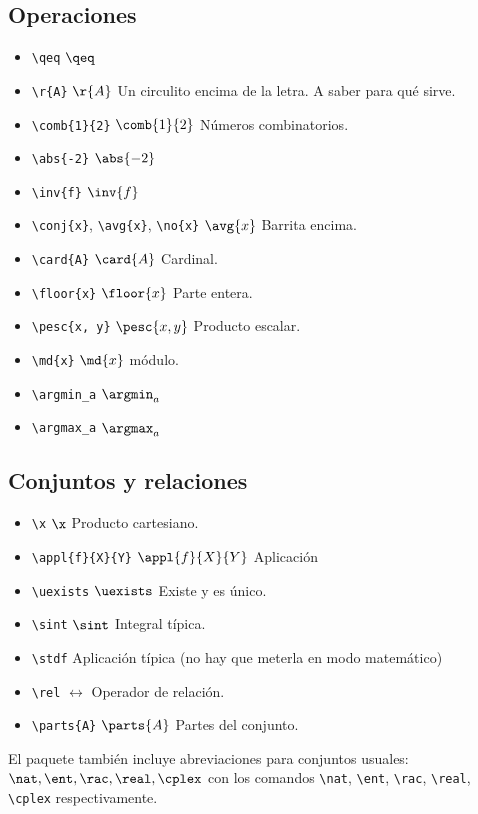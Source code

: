 \documentclass{apuntes}
\begin{document}
\subsection{Operaciones}
\begin{itemize}
\item \verb|\qeq| $\qeq$
\item \verb|\r{A}| $\r{A}$ Un circulito encima de la letra. A saber para qué sirve.
\item \verb|\comb{1}{2}| $\comb{1}{2}$ Números combinatorios.
\item \verb|\abs{-2}| $\abs{-2}$
\item \verb|\inv{f}| $\inv{f}$
\item \verb|\conj{x}|, \verb|\avg{x}|, \verb|\no{x}| $\avg{x}$ Barrita encima.
\item \verb|\card{A}| $\card{A}$ Cardinal.
\item \verb|\floor{x}| $\floor{x}$ Parte entera.
\item \verb|\pesc{x, y}| $\pesc{x, y}$ Producto escalar.
\item \verb|\md{x}| $\md{x}$ módulo.
\item \verb|\argmin_a| $\argmin_a$
\item \verb|\argmax_a| $\argmax_a$
\end{itemize}

\subsection{Conjuntos y relaciones}
\begin{itemize}
\item \verb|\x| $\x$  Producto cartesiano.
\item \verb|\appl{f}{X}{Y}| $\appl{f}{X}{Y}$ Aplicación
\item \verb|\uexists| $\uexists$ Existe y es único.
\item \verb|\sint| $\sint$ Integral típica.
\item \verb|\stdf| \stdf Aplicación típica (no hay que meterla en modo matemático)
\item \verb|\rel| $\rel$ Operador de relación.
\item \verb|\parts{A}| $\parts{A}$ Partes del conjunto.
\end{itemize}

El paquete también incluye abreviaciones para conjuntos usuales: $\nat, \ent, \rac, \real, \cplex$ con los comandos \verb|\nat|, \verb|\ent|, \verb|\rac|, \verb|\real|, \verb|\cplex| respectivamente.
\end{document}
